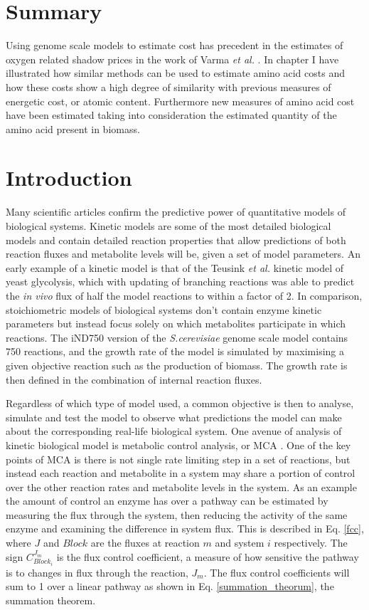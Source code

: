 \section*{Summary}

Using genome scale models to estimate cost has precedent in the estimates of oxygen related shadow prices in the work of Varma \emph{et al.} \cite{varma1993}. In chapter I have illustrated how similar methods can be used to estimate amino acid costs and how these costs show a high degree of similarity with previous measures of energetic cost, or atomic content. Furthermore new measures of amino acid cost have been estimated taking into consideration the estimated quantity of the amino acid present in biomass.

\clearpage

\section{Introduction}

Many scientific articles confirm the predictive power of quantitative models of biological systems. Kinetic models are some of the most detailed biological models and contain detailed reaction properties that allow predictions of both reaction fluxes and metabolite levels will be, given a set of model parameters. An early example of a kinetic model is that of the Teusink \emph{et al.} \cite{teusink2000} kinetic model of yeast glycolysis, which with updating of branching reactions was able to predict the \emph{in vivo} flux of half the model reactions to within a factor of 2. In comparison, stoichiometric models of biological systems don't contain enzyme kinetic parameters but instead focus solely on which metabolites participate in which reactions. The iND750 version of the \emph{S.cerevisiae} genome scale model \cite{duarte2004a} contains 750 reactions, and the growth rate of the model is simulated by maximising a given objective reaction such as the production of biomass. The growth rate is then defined in the combination of internal reaction fluxes.

Regardless of which type of model used, a common objective is then to analyse, simulate and test the model to observe what predictions the model can make about the corresponding real-life biological system. One avenue of analysis of kinetic biological model is metabolic control analysis, or MCA \cite{fell1997}. One of the key points of MCA is there is not single rate limiting step in a set of reactions, but instead each reaction and metabolite in a system may share a portion of control over the other reaction rates and metabolite levels in the system. As an example the amount of control an enzyme has over a pathway can be estimated by measuring the flux through the system, then reducing the activity of the same enzyme and examining the difference in system flux. This is described in Eq. \ref{fcc}, where $J$ and $Block$ are the fluxes at reaction $m$ and system $i$ respectively. The sign $C_{Block_i}^{J_m}$ is the flux control coefficient, a measure of how sensitive the pathway is to changes in flux through the reaction, $J_{m}$. The flux control coefficients will sum to 1 over a linear pathway as shown in Eq. \ref{summation_theorum}, the summation theorem.


